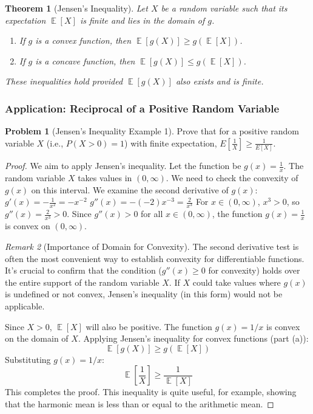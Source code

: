 \documentclass[11pt, letterpaper]{article}
\theoremstyle{plain} %
\newtheorem{theorem}{Theorem}[section] %
\theoremstyle{definition} %
\newtheorem{problem}{Problem}[section] %
\theoremstyle{remark} %
\newtheorem{remark}[theorem]{Remark}
\DeclareMathOperator{\E}{\mathbb{E}}
\begin{document}
\begin{theorem}[Jensen's Inequality]
Let $X$ be a random variable such that its expectation $\E[X]$ is finite and lies in the domain of $g$.
\begin{enumerate}[label=(\alph*)]
    \item If $g$ is a convex function, then $\E[g(X)] \ge g(\E[X])$.
    \item If $g$ is a concave function, then $\E[g(X)] \le g(\E[X])$.
\end{enumerate}
These inequalities hold provided $\E[g(X)]$ also exists and is finite.
\end{theorem}

\subsubsection{Application: Reciprocal of a Positive Random Variable}
\begin{problem}[Jensen's Inequality Example 1]
\label{prob:jensen_reciprocal}
Prove that for a positive random variable $X$ (i.e., $P(X>0)=1$) with finite expectation, $E\left[\frac{1}{X}\right] \ge \frac{1}{E[X]}$.
\end{problem}
\begin{proof}
We aim to apply Jensen's inequality. Let the function be $g(x) = \frac{1}{x}$.
The random variable $X$ takes values in $(0, \infty)$. We need to check the convexity of $g(x)$ on this interval.
We examine the second derivative of $g(x)$:
$g'(x) = -\frac{1}{x^2} = -x^{-2}$
$g''(x) = -(-2)x^{-3} = \frac{2}{x^3}$
For $x \in (0, \infty)$, $x^3 > 0$, so $g''(x) = \frac{2}{x^3} > 0$.
Since $g''(x) > 0$ for all $x \in (0, \infty)$, the function $g(x) = \frac{1}{x}$ is convex on $(0, \infty)$.

\begin{remark}[Importance of Domain for Convexity]
    The second derivative test is often the most convenient way to establish convexity for differentiable functions. It's crucial to confirm that the condition ($g''(x) \ge 0$ for convexity) holds over the entire support of the random variable $X$. If $X$ could take values where $g(x)$ is undefined or not convex, Jensen's inequality (in this form) would not be applicable.
\end{remark}

Since $X > 0$, $\E[X]$ will also be positive. The function $g(x) = 1/x$ is convex on the domain of $X$.
Applying Jensen's inequality for convex functions (part (a)):
\[ \E[g(X)] \ge g(\E[X]) \]
Substituting $g(x) = 1/x$:
\[ \E\left[\frac{1}{X}\right] \ge \frac{1}{\E[X]} \]
This completes the proof. This inequality is quite useful, for example, showing that the harmonic mean is less than or equal to the arithmetic mean.
\end{proof}
\end{document}
